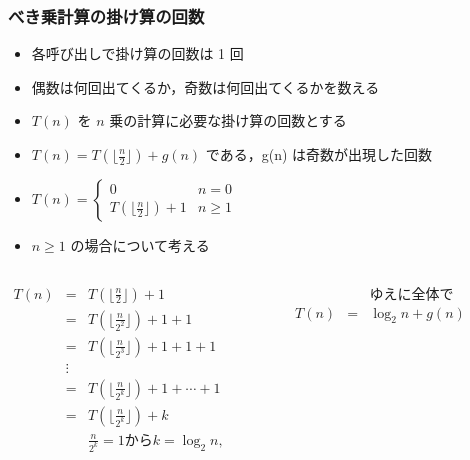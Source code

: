 \begin{frame}
\frametitle{べき乗計算の掛け算の回数}
  \begin{itemize}
\scriptsize
\item 各呼び出しで掛け算の回数は 1 回
\item 偶数は何回出てくるか，奇数は何回出てくるかを数える
\item \(T(n)\) を $n$ 乗の計算に必要な掛け算の回数とする
\item \(T(n) = T(\lfloor\frac{n}{2}\rfloor)+g(n)\) である，g(n) は奇数が出現した回数
\item \(T(n) =
    \begin{cases}
0 & n=0\\
T(\lfloor\frac{n}{2}\rfloor)+1 & n\geq 1
    \end{cases}\)
\item \(n\geq 1\) の場合について考える
  \end{itemize}
  \begin{columns}[t]
    \begin{column}{0.45\textwidth}
\centering
      \begin{math}
        \begin{array}{rcl}
T(n) &=& T(\lfloor\frac{n}{2}\rfloor)+1\\
     &=& T(\lfloor\frac{n}{2^2}\rfloor)+1+1\\
     &=& T(\lfloor\frac{n}{2^3}\rfloor)+1+1+1\\
&\vdots&\\
     &=& T(\lfloor\frac{n}{2^k}\rfloor)+1+\cdots+1\\
     &=& T(\lfloor\frac{n}{2^k}\rfloor)+k\\
     && \text{\(\frac{n}{2^k}=1\)から\(k=\log_2 n\),}\\
        \end{array}
      \end{math}
    \end{column}
    \begin{column}{0.35\textwidth}
      \begin{math}
        \begin{array}{rcl}
     && \text{ゆえに全体で}\\
T(n) &=& \log_2 n + g(n)
        \end{array}
      \end{math}
    \end{column}
  \end{columns}
\end{frame}
